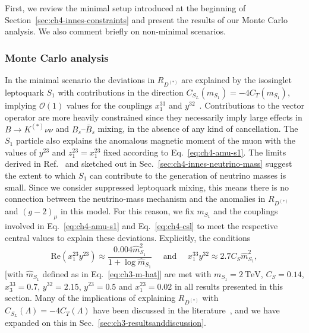 First, we review the minimal setup introduced at the beginning of
Section~\ref{sec:ch4-innes-constraints} and present the results of our Monte
Carlo analysis. We also comment briefly on non-minimal scenarios.

\subsubsection{Monte Carlo analysis}

In the minimal scenario the deviations in $R_{D^{(*)}}$ are explained by the
isosinglet leptoquark $S_{1}$ with contributions in the direction
$C_{S_L}(m_{S_{1}}) = -4 C_T(m_{S_{1}})$, implying $\mathcal{O}(1)$ values for
the couplings $x_{1}^{33}$ and $y^{32}$~\cite{Cai:2017wry, Angelescu:2018tyl,
  Feruglio:2018fxo}. Contributions to the vector operator are more heavily
constrained since they necessarily imply large effects in $B \to K^{(*)} \nu\nu$
and $B_s$--$\bar{B}_s$ mixing, in the absence of any kind of cancellation. The
$S_{1}$ particle also explains the anomalous magnetic moment of the muon with
the values of $y^{23}$ and $z_{1}^{23} = x_{1}^{23}$ fixed according to
Eq.~\eqref{eq:ch4-amu-s1}. The limits derived in Ref.~\cite{Bigaran:2019bqv} and
sketched out in Sec.~\ref{sec:ch4-innes-neutrino-mass} suggest the extent to
which $S_{1}$ can contribute to the generation of neutrino masses is small.
Since we consider suppressed leptoquark mixing, this means there is no
connection between the neutrino-mass mechanism and the anomalies in
$R_{D^{(*)}}$ and $(g-2)_{\mu}$ in this model. For this reason, we fix
$m_{S_{1}}$ and the couplings involved in Eq.~\eqref{eq:ch4-amu-s1} and
Eq.~\eqref{eq:ch4-csl} to meet the respective central values to explain these
deviations. Explicitly, the conditions
\begin{equation}
\text{Re}(x_{1}^{23} y^{23}) \approx \frac{0.004 \hat{m}_{S_{1}}^2}{1 + \log \hat{m}_{S_{1}}} \quad \text{ and } \quad x_{1}^{33} y^{32} \approx 2.7 C_{S} \hat{m}_{S_{1}}^2,
\end{equation}
[with $\hat{m}_{S_{1}}$ defined as in Eq.~\eqref{eq:ch3-m-hat}] are met with
$m_{S_{1}} = \SI{2}{\TeV}$, $C_{S} = 0.14$, $x^{33}_{3} = 0.7$, $y^{32} = 2.15$,
$y^{23} = 0.5$ and $x^{23}_{1} = 0.02$ in all results presented in this section.
Many of the implications of explaining $R_{D^{(*)}}$ with
$C_{S_L} (\Lambda) = -4 C_T(\Lambda)$ have been discussed in the
literature~\cite{Feruglio:2018fxo, Asadi:2018sym, Alok:2019uqc}, and we have
expanded on this in Sec.~\ref{sec:ch3-resultsanddiscussion}.

